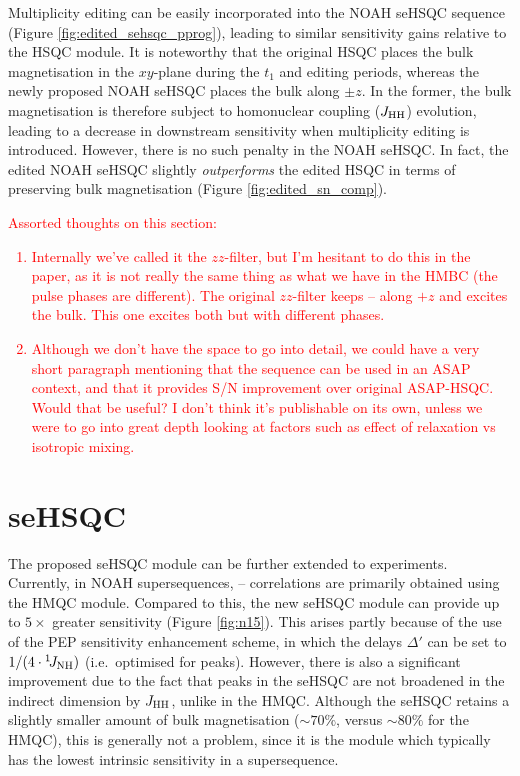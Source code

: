 \documentclass[11pt]{article}
\newcommand*{\carbon}{\ce{^{13}C}}
\newcommand*{\proton}{\ce{^{1}H}}
\newcommand*{\nitrogen}{\ce{^{15}N}}
\newcommand*{\red}[1]{\textcolor{red}{#1}}
\newcommand*{\onejnh}{{}^{1}\!J_{\ce{NH}}}
\newcommand*{\jhh}{J_{\ce{HH}}}
\newcommand*{\figref}[1]{Figure \ref{fig:#1}}
\begin{document}
Multiplicity editing can be easily incorporated into the NOAH seHSQC sequence (\figref{edited_sehsqc_pprog}), leading to similar sensitivity gains relative to the HSQC module.
It is noteworthy that the original HSQC places the bulk magnetisation in the $xy$-plane during the $t_1$ and editing periods, whereas the newly proposed NOAH seHSQC places the bulk along $\pm z$.
In the former, the bulk magnetisation is therefore subject to homonuclear coupling ($\jhh$) evolution, leading to a decrease in downstream sensitivity when multiplicity editing is introduced.
However, there is no such penalty in the NOAH seHSQC.
In fact, the edited NOAH seHSQC slightly \textit{outperforms} the edited HSQC in terms of preserving bulk magnetisation (\figref{edited_sn_comp}).

\red{
    Assorted thoughts on this section:
    \begin{enumerate}
        \item Internally we've called it the $zz$-filter, but I'm hesitant to do this in the paper, as it is not really the same thing as what we have in the HMBC (the pulse phases are different). The original $zz$-filter keeps \carbon{}--\proton{} along $+z$ and excites the bulk. This one excites both but with different phases.
        \item Although we don't have the space to go into detail, we could have a very short paragraph mentioning that the sequence can be used in an ASAP context, and that it provides S/N improvement over original ASAP-HSQC. Would that be useful? I don't think it's publishable on its own, unless we were to go into great depth looking at factors such as effect of relaxation vs isotropic mixing.
    \end{enumerate}
}

\section*{\texorpdfstring{\nitrogen{}}{15N} seHSQC}

The proposed seHSQC module can be further extended to \nitrogen{} experiments.
Currently, in NOAH supersequences, \nitrogen{}--\proton{} correlations are primarily obtained using the HMQC module.\autocite{Kupce2007MRC, Kupce2017ACIE}
Compared to this, the new seHSQC module can provide up to $5\times$ greater sensitivity (\figref{n15}).
This arises partly because of the use of the PEP sensitivity enhancement scheme, in which the delays $\Delta'$ can be set to $1/(4 \cdot \onejnh)$ (i.e.\ optimised for  peaks).
However, there is also a significant improvement due to the fact that peaks in the seHSQC are not broadened in the indirect dimension by $\jhh$, unlike in the HMQC.
Although the seHSQC retains a slightly smaller amount of bulk magnetisation ($\sim 70\%$, versus $\sim 80\%$ for the HMQC), this is generally not a problem, since it is the \nitrogen{} module which typically has the lowest intrinsic sensitivity in a supersequence.
\end{document}
